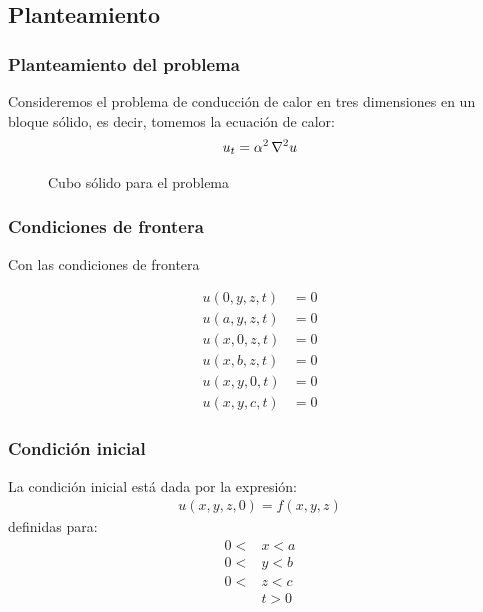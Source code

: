 \documentclass[12pt]{beamer}
\begin{document}
\subsection{Planteamiento}
\begin{frame}
\frametitle{Planteamiento del problema}
Consideremos el problema de conducción de calor en tres dimensiones en un bloque sólido, es decir, tomemos la ecuación de calor:
\begin{align}
u_{t} = \alpha^{2} \, \laplacian{u}
\label{eq:ecuacion_02_214}
\end{align}
\begin{figure}
    \centering
    
    \caption{Cubo sólido para el problema}
\end{figure}
\end{frame}
\begin{frame}
\frametitle{Condiciones de frontera}
Con las condiciones de frontera
\\
\begin{minipage}{0.4\textwidth}
\begin{figure}
    \centering
    
\end{figure}
\end{minipage}
\hspace{1cm}
\begin{minipage}{0.4\textwidth}
\begin{align}
u (0, y, z, t) &= 0 \label{eq:ecuacion_0215} \\ 
u (a, y, z, t) &= 0 \label{eq:ecuacion_0216} \\ 
u (x, 0, z, t) &= 0 \label{eq:ecuacion_0217} \\
u (x, b, z, t) &= 0 \label{eq:ecuacion_0218} \\
u (x, y, 0, t) &= 0 \label{eq:ecuacion_0219} \\
u (x, y, c, t) &= 0 \label{eq:ecuacion_0220}
\end{align}
\end{minipage}
\end{frame}
\begin{frame}
\frametitle{Condición inicial}
La condición inicial está dada por la expresión:
\begin{align}
u (x, y, z, 0) = f (x, y, z)
\label{eq:ecuacion_02_221}
\end{align}
definidas para: 
\begin{align*}
0 < &x < a \\[0.5em]
0 < &y < b \\[0.5em]
0 < &z < c \\[0.5em]
&t > 0
\end{align*}
\end{frame}
\end{document}
